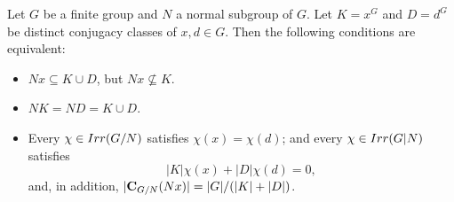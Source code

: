 \documentclass[10pt,a4paper]{amsart}
\begin{document}
 \begin{theorem}\label{2} Let $G$ be a finite group and $N$ a normal subgroup of $G$. Let $K =x^G$ and $D=d^G$ be distinct conjugacy classes of $x,d \in G$. Then the following conditions are equivalent:

 \begin{itemize}
 \item[(a)] $Nx \subseteq K \cup D$, but $Nx \not\subseteq K$.
 \item[(b)] $NK=ND=K\cup D$.
 \item[(c)] Every  $\chi \in {\rm Irr}(G/N)$ satisfies $\chi(x)=\chi(d)$; and  every $\chi\in {\rm Irr}(G|N)$ satisfies
 $$|K|\chi(x) +|D|\chi(d)=0,$$
and, in addition, $|{\bf C}_{G/N}(Nx)|= |G|/(|K|+|D|)$.
 \end{itemize}



\end{theorem}
\end{document}
